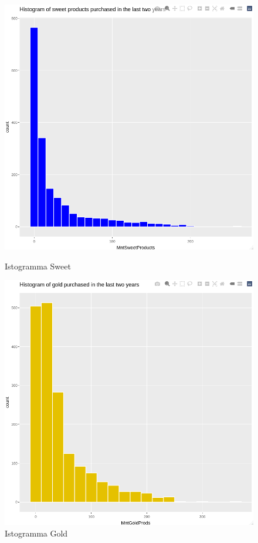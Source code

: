 \documentclass[letterpaper,11pt]{article}
\begin{document}
\begin{figure}[H]
  \centering
  \begin{minipage}[b]{0.4\textwidth}
    \includegraphics[width=\textwidth]{Img/EDA/EDA022.png}
    \caption{Istogramma Sweet}
     \label{fig:IstogrammaSweet}
  \end{minipage}
  \hfill
  \begin{minipage}[b]{0.4\textwidth}
    \includegraphics[width=\textwidth]{Img/EDA/EDA023.png}
    \caption{Istogramma Gold}
     \label{fig:IstogrammaGold}
  \end{minipage}
\end{figure}
\end{document}
